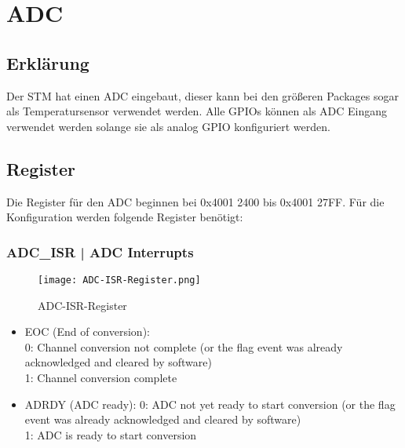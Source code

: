 \newpage
\section{ADC}
    \subsection{Erklärung}
    Der STM hat einen ADC eingebaut, dieser kann bei den größeren Packages sogar als Temperatursensor verwendet werden.
    Alle GPIOs können als ADC Eingang verwendet werden solange sie als analog GPIO konfiguriert werden. 
    
    \subsection{Register}
        Die Register für den ADC beginnen bei 0x4001 2400 bis 0x4001 27FF.
        Für die Konfiguration werden folgende Register benötigt:

        \subsubsection{ADC\_ISR | ADC Interrupts}
            \begin{figure}[!htb]
                \centering
                \texttt{[image: ADC-ISR-Register.png]}
                \caption{ADC-ISR-Register}
                \label{caption:ADC-ISR-Register}
            \end{figure}
             
            \begin{itemize}
                \item EOC (End of conversion):\\
                0: Channel conversion not complete (or the flag event was already acknowledged and cleared by
                software)\\
                1: Channel conversion complete
                \item ADRDY (ADC ready):
                0: ADC not yet ready to start conversion (or the flag event was already acknowledged and cleared
                by software)\\
                1: ADC is ready to start conversion
            \end{itemize}
            
\newpage
